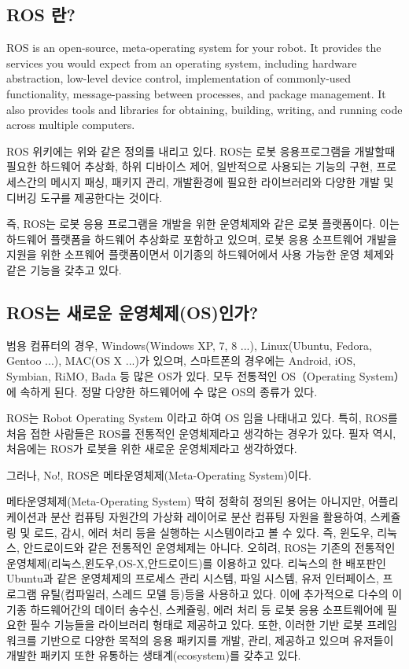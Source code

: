 \subsection{ROS 란?}

ROS is an open-source, meta-operating system for your robot.
It provides the services you would expect from an operating system, including hardware abstraction, low-level device control, implementation of commonly-used functionality, message-passing between processes, and package management.
It also provides tools and libraries for obtaining, building, writing, and running code across multiple computers.

ROS 위키에는 위와 같은 정의를 내리고 있다. ROS는 로봇 응용프로그램을 개발할때 필요한 하드웨어 추상화, 하위 디바이스 제어, 일반적으로 사용되는 기능의 구현, 프로세스간의 메시지 패싱, 패키지 관리, 개발환경에 필요한 라이브러리와 다양한 개발 및 디버깅 도구를 제공한다는 것이다. 

즉, ROS는 로봇 응용 프로그램을 개발을 위한 운영체제와 같은 로봇 플랫폼이다.
이는 하드웨어 플랫폼을 하드웨어 추상화로 포함하고 있으며, 로봇 응용 소프트웨어 개발을 지원을 위한 소프웨어 플랫폼이면서 이기종의 하드웨어에서 사용 가능한 운영 체제와 같은 기능을 갖추고 있다.

\subsection{ROS는 새로운 운영체제(OS)인가?}

범용 컴퓨터의 경우, Windows(Windows XP, 7, 8 ...), Linux(Ubuntu, Fedora, Gentoo ...), MAC(OS X ...)가 있으며, 스마트폰의 경우에는 Android, iOS, Symbian, RiMO, Bada 등 많은 OS가 있다.
모두 전통적인 OS（Operating System）에 속하게 된다.
정말 다양한 하드웨어에 수 많은 OS의 종류가 있다. 

ROS는 Robot Operating System 이라고 하여 OS 임을 나태내고 있다.
특히, ROS를 처음 접한 사람들은 ROS를 전통적인 운영체제라고 생각하는 경우가 있다.
필자 역시, 처음에는 ROS가 로봇을 위한 새로운 운영체제라고 생각하였다. 

그러나, No!, ROS은 메타운영체제(Meta-Operating System)이다.

메타운영체제(Meta-Operating System) 딱히 정확히 정의된 용어는 아니지만, 어플리케이션과 분산 컴퓨팅 자원간의 가상화 레이어로 분산 컴퓨팅 자원을 활용하여, 스케쥴링 및 로드, 감시, 에러 처리 등을 실행하는 시스템이라고 볼 수 있다.
즉, 윈도우, 리눅스, 안드로이드와 같은 전통적인 운영체제는 아니다.
오히려, ROS는 기존의 전통적인 운영체제(리눅스,윈도우,OS-X,안드로이드)를 이용하고 있다.
리눅스의 한 배포판인 Ubuntu과 같은 운영체제의 프로세스 관리 시스템, 파일 시스템, 유저 인터페이스, 프로그램 유틸(컴파일러, 스레드 모델 등)등을 사용하고 있다.
이에 추가적으로 다수의 이기종 하드웨어간의 데이터 송수신, 스케쥴링, 에러 처리 등 로봇 응용 소프트웨어에 필요한 필수 기능들을 라이브러리 형태로 제공하고 있다.
또한, 이러한 기반 로봇 프레임워크를 기반으로 다양한 목적의 응용 패키지를 개발, 관리, 제공하고 있으며 유저들이 개발한 패키지 또한 유통하는 생태계(ecosystem)를 갖추고 있다.

